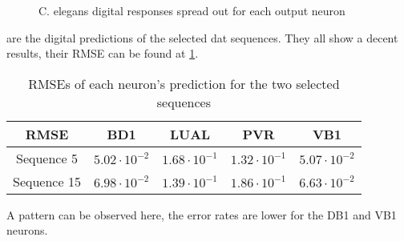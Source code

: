 \begin{figure}[H]
  \centering
  \begin{minipage}{\columnwidth}
    \hfill
  \end{minipage}
  \begin{minipage}{\columnwidth}
    \hfill
  \end{minipage}
  \caption{\ac{C. elegans} digital responses spread out for each output neuron}
  \label{graph:digital5Celegans}
\end{figure}

 are the digital predictions of the selected dat sequences. They all show a decent results, their \ac{RMSE} can be found at \cref{tab:celegansDigital}.

\begin{table}[H]
  \centering
  \begin{tabular}{|c|c|c|c|c|}
    \hline
    \cellcolor[HTML]{808080}\acs{RMSE} & BD1 & LUAL & PVR & VB1\\
    \hline
    Sequence 5 & $5.02\cdot 10^{-2}$ & $1.68\cdot 10^{-1}$ & $1.32\cdot 10^{-1}$ & $5.07\cdot 10^{-2}$\\
    \hline
    Sequence 15 & $6.98\cdot 10^{-2}$ & $1.39\cdot 10^{-1}$ & $1.86\cdot 10^{-1}$ & $6.63\cdot 10^{-2}$\\
    \hline
  \end{tabular}
  \caption{\acp{RMSE} of each neuron's prediction for the two selected sequences}
  \label{tab:celegansDigital}
\end{table}

A pattern can be observed here, the error rates are lower for the DB1 and VB1 neurons.

